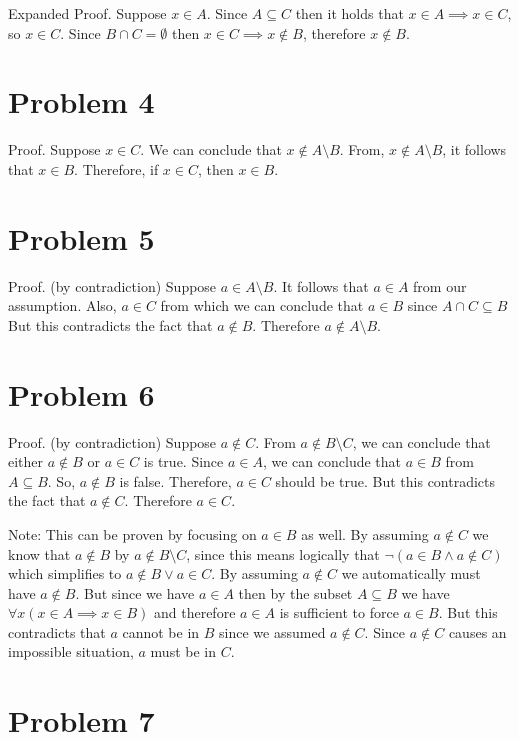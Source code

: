 \documentclass{article}
\begin{document}
Expanded Proof. Suppose $x \in A$. Since $A \subseteq C$ then it holds that
$x \in A \implies x \in C$, so $x \in C$. Since $B \cap C = \emptyset$ then
$x \in C \implies x \notin B$, therefore $x \notin B$.

\section{Problem 4}

Proof. Suppose $x \in C$. We can conclude that $x \notin A \setminus
B$. From, $x \notin A \setminus B$, it follows that $x \in B$.
Therefore, if $x \in C$, then $x \in B$.

\section{Problem 5}

Proof. (by contradiction) Suppose $a \in A \setminus B$. 
It follows that $a \in A$ from our assumption. Also,
$a \in C$ from which we can conclude that $a \in B$ since $A \cap C
\subseteq B$ But this contradicts the fact that $a \notin B$.
Therefore $a \notin A \setminus B$.

\section{Problem 6}

Proof. (by contradiction) Suppose $a \notin C$. From $a
\notin B \setminus C$, we can conclude that either $a \notin B$ or $a
\in C$ is true. Since $a \in A$, we can conclude that $a \in B$ from
$A \subseteq B$. So, $a \notin B$ is false. Therefore, $a \in C$
should be true. But this contradicts the fact that $a \notin C$.
Therefore $a \in C$.

Note: This can be proven by focusing on $a \in B$ as well. By assuming
$a \notin C$ we know that $a \notin B$ by $a \notin B \setminus C$, since this
means logically that $\neg (a \in B \land a \notin C)$ which simplifies
to $a \notin B \lor a \in C$. By assuming $a \notin C$ we automatically
must have $a \notin B$. But since we have $a \in A$ then by the subset
$A \subseteq B$ we have $\forall x ( x \in A \implies x \in B)$ and
therefore $a \in A$ is sufficient to force $a \in B$. But this
contradicts that $a$ cannot be in $B$ since we assumed $a \notin C$.
Since $a \notin C$ causes an impossible situation, $a$ must be in $C$.

\section{Problem 7}
\end{document}
